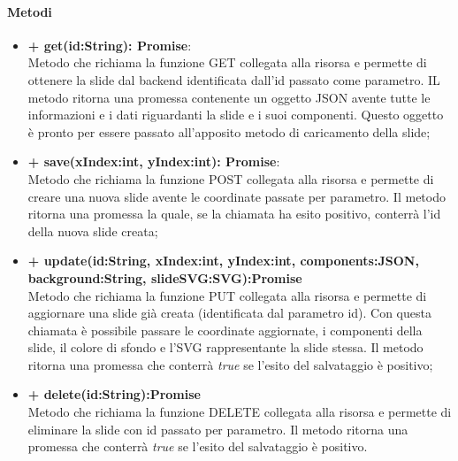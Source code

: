 		\paragraph{Metodi}
		\begin{itemize}
			\item \textbf{+ get(id:String): Promise}:\\
			Metodo che richiama la funzione GET collegata alla risorsa e permette di ottenere la \gls{slide} dal backend identificata dall'id passato come parametro. IL metodo ritorna una promessa contenente un oggetto \gls{JSON} avente tutte le informazioni e i dati riguardanti la \gls{slide} e i suoi componenti. Questo oggetto è pronto per essere passato all'apposito metodo di caricamento della \gls{slide};
			\item \textbf{+ save(xIndex:int, yIndex:int): Promise}:\\
			Metodo che richiama la funzione POST collegata alla risorsa e permette di creare una nuova \gls{slide} avente le coordinate passate per parametro. Il metodo ritorna una promessa la quale, se la chiamata ha esito positivo, conterrà l'id della nuova \gls{slide} creata;\\
			\item \textbf{+ update(id:String, xIndex:int, yIndex:int, components:JSON, background:String, slideSVG:SVG):Promise}\\
			Metodo che richiama la funzione PUT collegata alla risorsa e permette di aggiornare una \gls{slide} già creata (identificata dal parametro id). Con questa chiamata è possibile passare le coordinate aggiornate, i componenti della \gls{slide}, il colore di sfondo e l'SVG rappresentante la \gls{slide} stessa. Il metodo ritorna una promessa che conterrà \textit{true} se l'esito del salvataggio è positivo;
			\item \textbf{+ delete(id:String):Promise}\\
			Metodo che richiama la funzione DELETE collegata alla risorsa e permette di eliminare la \gls{slide} con id passato per parametro. Il metodo ritorna una promessa che conterrà \textit{true} se l'esito del salvataggio è positivo.
			

\end{itemize}
